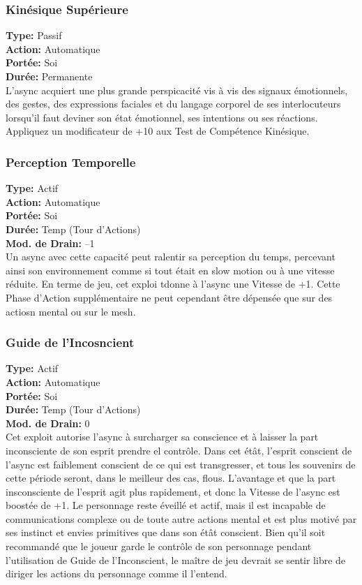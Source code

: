 \subsubsection{Kinésique Supérieure} \textbf{Type:} Passif \\ \textbf{Action:} Automatique \\ \textbf{Portée:} Soi \\ \textbf{Durée:} Permanente \\ L'async acquiert une plus grande perspicacité vis à vis des signaux émotionnels, des gestes, des expressions faciales et du langage corporel de ses interlocuteurs lorsqu'il faut deviner son état émotionnel, ses intentions ou ses réactions. Appliquez un modificateur de +10 aux Test de Compétence Kinésique. 

\subsubsection{Perception Temporelle} \textbf{Type:} Actif \\ \textbf{Action:} Automatique \\ \textbf{Portée:} Soi \\ \textbf{Durée:} Temp (Tour d'Actions) \\ \textbf{Mod. de Drain:} –1 \\ Un async avec cette capacité peut ralentir sa perception du temps, percevant ainsi son environnement comme si tout était en slow motion ou à une vitesse réduite. En terme de jeu, cet exploi tdonne à l'async une Vitesse de +1. Cette Phase d'Action supplémentaire ne peut cependant être dépensée que sur des actiosn mental ou sur le mesh. 

\subsubsection{Guide de l'Incosncient} \textbf{Type:} Actif \\ \textbf{Action:} Automatique \\ \textbf{Portée:} Soi \\ \textbf{Durée:} Temp (Tour d'Actions) \\ \textbf{Mod. de Drain:} 0 \\ Cet exploit autorise l'async à surcharger sa conscience et à laisser la part inconsciente de son esprit prendre el contrôle. Dans cet étât, l'esprit conscient de l'async est faiblement conscient de ce qui est transgresser, et tous les souvenirs de cette période seront, dans le meilleur des cas, flous. L'avantage et que la part insconsciente de l'esprit agit plus rapidement, et donc la Vitesse de l'async est boostée de +1. Le personnage reste éveillé et actif, mais il est incapable de communications complexe ou de toute autre actions mental et est plus motivé par ses instinct et envies primitives que dans son étât conscient. Bien qu'il soit recommandé que le joueur garde le contrôle de son personnage pendant l'utilisation de Guide de l'Inconscient, le maître de jeu devrait se sentir libre de diriger les actions du personnage comme il l'entend. 

